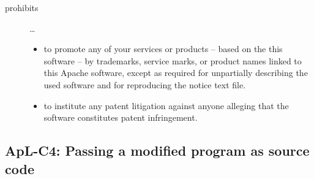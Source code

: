 \begin{description}
\item[prohibits] \ldots
\begin{itemize}
  \item to promote any of your services or products – based on the this software
  – by trademarks, service marks, or product names linked to this Apache
  software, except as required for unpartially describing the used software and
  for reproducing the notice text file.
  \item to institute any patent litigation against anyone alleging that the
  software constitutes patent infringement.
\end{itemize}

\end{description}

\subsection{ApL-C4: Passing a modified program as source code}
\label{OSUC-04S-Apache20} 

